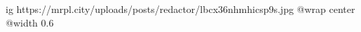  
 
 
 
 

\ifcmt
  ig https://mrpl.city/uploads/posts/redactor/lbcx36nhmhicsp9s.jpg
  @wrap center
  @width 0.6
\fi
